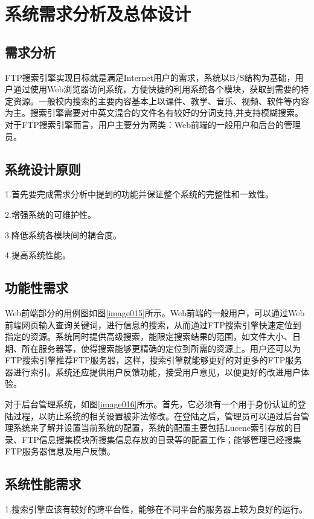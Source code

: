 
\chapter{系统需求分析及总体设计}
\section{需求分析}
FTP搜索引擎实现目标就是满足Internet用户的需求，系统以B/S结构为基础，用户通过使用Web浏览器访问系统，方便快捷的利用系统各个模块，获取到需要的特定资源。一般校内搜索的主要内容基本上以课件、教学、音乐、视频、软件等内容为主。搜索引擎需要对中英文混合的文件名有较好的分词支持,并支持模糊搜索。对于FTP搜索引擎而言，用户主要分为两类：Web前端的一般用户和后台的管理员。
\section{系统设计原则}
1.首先要完成需求分析中提到的功能并保证整个系统的完整性和一致性。

2.增强系统的可维护性。

3.降低系统各模块间的耦合度。

4.提高系统性能。
\section{功能性需求}
Web前端部分的用例图如图\ref{image015}所示。Web前端的一般用户，可以通过Web前端网页输入查询关键词，进行信息的搜索，从而通过FTP搜索引擎快速定位到指定的资源。系统同时提供高级搜索，能限定搜索结果的范围，如文件大小、日期、所在服务器等，使得搜索能够更精确的定位到所需的资源上。用户还可以为FTP搜索引擎推荐FTP服务器，这样，搜索引擎就能够更好的对更多的FTP服务器进行索引。系统还应提供用户反馈功能，接受用户意见，以便更好的改进用户体验。
\newpage
{}

对于后台管理系统，如图\ref{image016}所示。首先，它必须有一个用于身份认证的登陆过程，以防止系统的相关设置被非法修改。在登陆之后，管理员可以通过后台管理系统来了解并设置当前系统的配置，系统的配置主要包括Lucene索引存放的目录、FTP信息搜集模块所搜集信息存放的目录等的配置工作；能够管理已经搜集FTP服务器信息及用户反馈。


\section{系统性能需求}
1.搜索引擎应该有较好的跨平台性，能够在不同平台的服务器上较为良好的运行。


